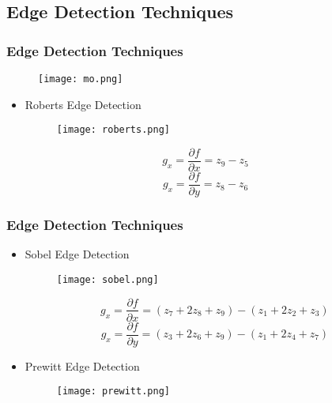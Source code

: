 \documentclass[notheorems,serif,table,compress]{beamer}  %
\begin{document}
\subsection{Edge Detection Techniques}
\begin{frame}        
\frametitle{Edge Detection Techniques}
    \begin{figure}
    \texttt{[image: mo.png]} 
    \end{figure}
\begin{itemize}
\item Roberts Edge Detection
    \begin{figure}
    \texttt{[image: roberts.png]} 
    \end{figure}
\end{itemize}
    \begin{displaymath}
    g_{x}= \frac{\partial f}{\partial x}=z_{9}-z_{5}
    \end{displaymath}
    \begin{displaymath}
    g_{x}= \frac{\partial f}{\partial y}=z_{8}-z_{6}
    \end{displaymath}
\end{frame}

\begin{frame}
\frametitle{Edge Detection Techniques}
\begin{itemize}
\item Sobel Edge Detection
    \begin{figure}
    \texttt{[image: sobel.png]} 
    \end{figure}
    \begin{displaymath}
    g_{x}= \frac{\partial f}{\partial x}=(z_{7}+2z_{8}+z_{9})-(z_{1}+2z_{2}+z_{3})
    \end{displaymath}
    \begin{displaymath}
    g_{x}= \frac{\partial f}{\partial y}=(z_{3}+2z_{6}+z_{9})-(z_{1}+2z_{4}+z_{7})
    \end{displaymath}
\item Prewitt Edge Detection
    \begin{figure}
    \texttt{[image: prewitt.png]} 
    \end{figure}

\end{itemize}
\end{frame}
\end{document}
